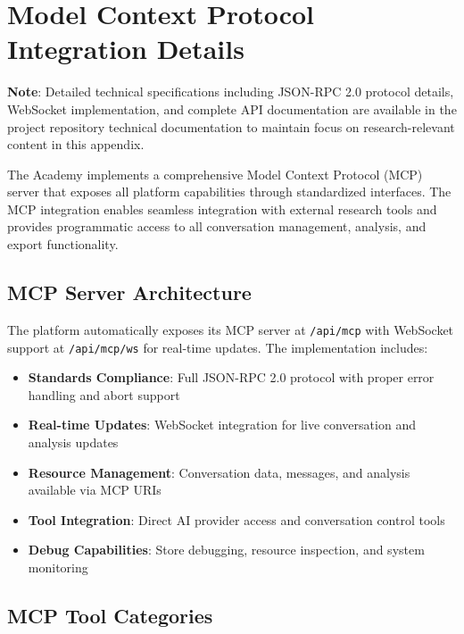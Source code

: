 \documentclass[11pt,letterpaper]{article}
\newcommand{\theacademy}{The Academy}
\begin{document}



\appendix

\section{Model Context Protocol Integration Details}
\label{app:mcp}

\textbf{Note}: Detailed technical specifications including JSON-RPC 2.0 protocol details, WebSocket implementation, and complete API documentation are available in the project repository technical documentation to maintain focus on research-relevant content in this appendix.

\theacademy{} implements a comprehensive Model Context Protocol (MCP) server that exposes all platform capabilities through standardized interfaces. The MCP integration enables seamless integration with external research tools and provides programmatic access to all conversation management, analysis, and export functionality.

\subsection{MCP Server Architecture}

The platform automatically exposes its MCP server at \texttt{/api/mcp} with WebSocket support at \texttt{/api/mcp/ws} for real-time updates. The implementation includes:

\begin{itemize}
    \item \textbf{Standards Compliance}: Full JSON-RPC 2.0 protocol with proper error handling and abort support
    \item \textbf{Real-time Updates}: WebSocket integration for live conversation and analysis updates
    \item \textbf{Resource Management}: Conversation data, messages, and analysis available via MCP URIs
    \item \textbf{Tool Integration}: Direct AI provider access and conversation control tools
    \item \textbf{Debug Capabilities}: Store debugging, resource inspection, and system monitoring
\end{itemize}

\subsection{MCP Tool Categories}
\end{document}
